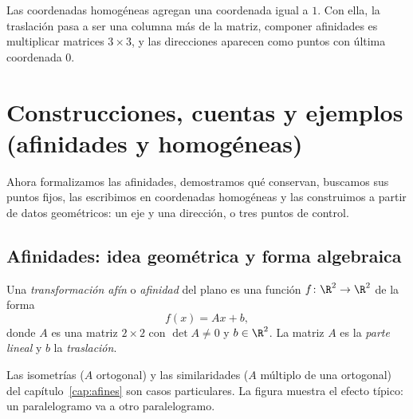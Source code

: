 \begin{idea}[Idea]
Las coordenadas homogéneas agregan una coordenada igual a \(1\). Con ella, la traslación pasa
a ser una columna más de la matriz, componer afinidades es multiplicar matrices \(3\times3\),
y las direcciones aparecen como puntos con última coordenada \(0\).
\end{idea}

\section{Construcciones, cuentas y ejemplos (afinidades y homogéneas)}

Ahora formalizamos las afinidades, demostramos qué conservan, buscamos sus puntos fijos, las
escribimos en coordenadas homogéneas y las construimos a partir de datos geométricos: un eje
y una dirección, o tres puntos de control.

{\small\vspace{1mm}\par}

\subsection{Afinidades: idea geométrica y forma algebraica}\label{sec:afinidades-geom}

\begin{definicion}\label{def:06-afinidad}
Una \emph{transformación afín} o \emph{afinidad} del plano es una función
\(f\colon\R^2\to\R^2\) de la forma
\[
  \boxed{f(x)=Ax+b},
\]
donde \(A\) es una matriz \(2\times2\) con \(\det A\neq0\) y \(b\in\R^2\). La matriz \(A\) es
la \emph{parte lineal} y \(b\) la \emph{traslación}.
\end{definicion}

Las isometrías (\(A\) ortogonal) y las similaridades (\(A\) múltiplo de una ortogonal) del
capítulo~\ref{cap:afines} son casos particulares. La figura muestra el efecto típico: un
paralelogramo va a otro paralelogramo.

\begin{center}
\end{center}

